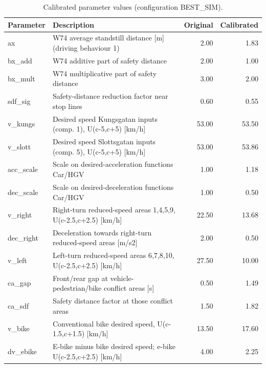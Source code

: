 \begin{table}[H]
\centering
\caption{Calibrated parameter values (configuration BEST\_SIM).}
\begin{tabular}{llrr}
\toprule
\textbf{Parameter} & \textbf{Description} & \textbf{Original} & \textbf{Calibrated}\\
\midrule
ax & W74 average standstill distance [m] (driving behaviour 1) & 2.00 & 1.83\\
bx\_add & W74 additive part of safety distance & 2.00 & 1.00\\
bx\_mult & W74 multiplicative part of safety distance & 3.00 & 2.00\\
sdf\_sig & Safety-distance reduction factor near stop lines & 0.60 & 0.55\\
v\_kungs & Desired speed Kungsgatan inputs (comp. 1), U(c-5,c+5) [km/h] & 53.00 & 53.50\\
v\_slott & Desired speed Slottsgatan inputs (comp. 5), U(c-5,c+5) [km/h] & 53.00 & 53.86\\
acc\_scale & Scale on desired-acceleration functions Car/HGV & 1.00 & 1.18\\
dec\_scale & Scale on desired-deceleration functions Car/HGV & 1.00 & 0.50\\
v\_right & Right-turn reduced-speed areas 1,4,5,9, U(c-2.5,c+2.5) [km/h] & 22.50 & 13.68\\
dec\_right & Deceleration towards right-turn reduced-speed areas [m/s2] & 2.00 & 0.50\\
v\_left & Left-turn reduced-speed areas 6,7,8,10, U(c-2.5,c+2.5) [km/h] & 27.50 & 10.00\\
ca\_gap & Front/rear gap at vehicle-pedestrian/bike conflict areas [s] & 0.50 & 1.49\\
ca\_sdf & Safety distance factor at those conflict areas & 1.50 & 1.82\\
v\_bike & Conventional bike desired speed, U(c-1.5,c+1.5) [km/h] & 13.50 & 17.60\\
dv\_ebike & E-bike minus bike desired speed; e-bike U(c-2.5,c+2.5) [km/h] & 4.00 & 2.25\\
\bottomrule
\end{tabular}
\end{table}

